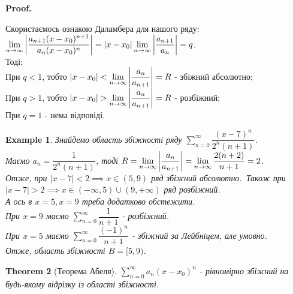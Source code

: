 \documentclass[a4paper, 10pt]{article}
\makeatletter
\def\huge{\displaystyle}
\def\qed{$\blacksquare$}
\theoremstyle{theoremdd}
\newtheorem{theorem}{Theorem}[subsection]
\theoremstyle{theoremdd}
\theoremstyle{theoremdd}
\theoremstyle{theoremdd}
\newtheorem{example}[theorem]{Example}
\theoremstyle{theoremdd}
\theoremstyle{theoremdd}
\theoremstyle{theoremdd}
\theoremstyle{theoremdd}
\renewenvironment{proof}[1][Proof.\\]{\par
\pushQED{\hfill \qed}%
\normalfont \topsep6\p@\@plus6\p@\relax
\trivlist
\item\relax
{\bfseries
#1\@addpunct{.}}\hspace\labelsep\ignorespaces
}{%
\popQED\endtrivlist\@endpefalse
}
\makeatother
\begin{document}
\begin{proof}
Скористаємось ознакою Даламбера для нашого ряду:\\
$\huge \lim_{n \to \infty} \abs{\dfrac{a_{n+1}(x-x_0)^{n+1}}{a_n(x-x_0)^n}} = |x-x_0| \lim_{n \to \infty} \abs{\dfrac{a_{n+1}}{a_n}} = q$.\\
Тоді:\\
При $q < 1$, тобто $|x-x_0| < \huge \lim_{n \to \infty} \abs{\dfrac{a_n}{a_{n+1}}} = R$ - збіжний абсолютно;\\
При $q > 1$, тобто $|x-x_0| > \huge \lim_{n \to \infty} \abs{\dfrac{a_n}{a_{n+1}}} = R$ - розбіжний;\\
При $q = 1$ - нема відповіді.
\end{proof}

\begin{example}
Знайдемо область збіжності ряду $\huge\sum_{n=0}^\infty \dfrac{(x-7)^n}{2^n (n+1)}$.\\
Маємо $a_n = \dfrac{1}{2^n (n+1)}$, тоді $R = \huge\lim_{n \to \infty} \abs{\dfrac{a_n}{a_{n+1}}} = \lim_{n \to \infty} \dfrac{2(n+2)}{n+1} = 2$.\\
Отже, при $|x-7| < 2 \implies x \in (5,9)$ ряд збіжний абсолютно.\
Також при $|x-7| > 2 \implies x \in (-\infty,5) \cup (9,+\infty)$ ряд розбіжний.\\
А ось в $x = 5, x = 9$ треба додатково обстежити.\\
При $x=9$ маємо $\huge\sum_{n=0}^\infty \dfrac{1}{n+1}$ - розбіжний.\\
При $x=5$ маємо $\huge\sum_{n=0}^\infty \dfrac{(-1)^n}{n+1}$ - збіжний за Лейбніцем, але умовно.\\
Отже, область збіжності $B = [5,9)$.
\end{example}

\begin{theorem}[Теорема Абеля]
$\huge \sum_{n=0}^\infty a_n(x-x_0)^n$ - рівномірно збіжний на будь-якому відрізку із області збіжності.
\end{theorem}
\end{document}
